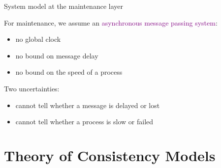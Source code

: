 \documentclass{beamer}
\newcommand{\fig}[3]
{
  \begin{figure}[htp]
    \centering
      \texttt{[image: \#2]}
      \caption[labelInTOC]{#3}
  \end{figure}
}
\newcommand{\largepurple}[1]{\textcolor{purple}{\large #1}}
\newcommand{\boxedpoint}[1]{
  \begin{center}
    \fbox{\textcolor{red}{\bf #1}}
  \end{center}
}
\begin{document}
\begin{frame}{System model at the maintenance layer}
  \begin{block}{For maintenance, we assume an \largepurple{asynchronous message
  passing system}:}
    \begin{itemize}
      \item no global clock
      \item no bound on message delay
      \item no bound on the speed of a process
    \end{itemize}
  \end{block}

  \begin{block}{Two uncertainties:}
    \begin{itemize}
      \item cannot tell whether a message is delayed or lost
      \item cannot tell whether a process is slow or failed
    \end{itemize}
  \end{block}

\end{frame}
\section{Theory of Consistency Models}

\end{document}
